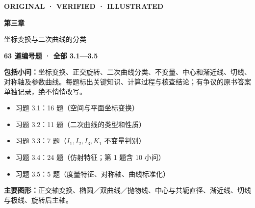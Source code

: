 \documentclass[UTF8,a4paper,11pt,fontset=none]{ctexart}
\begin{document}
\thispagestyle{empty}
\vspace*{19mm}
{\sffamily\large\color{mint}\bfseries ORIGINAL · VERIFIED · ILLUSTRATED}\par
\vspace{8mm}
{\sffamily\fontsize{29}{38}\selectfont\bfseries\color{ink} 第三章}\par
\vspace{1mm}
{\sffamily\fontsize{22}{31}\selectfont\color{accent} 坐标变换与二次曲线的分类}\par
\vspace{13mm}
\begin{tcolorbox}[colback=pale,colframe=edge,boxrule=0.6pt,arc=2mm,left=6mm,right=6mm,top=5mm,bottom=5mm]
\Large\bfseries\color{ink} 63 道编号题 · 全部 3.1—3.5 \par\bigskip
\normalsize\normalfont\color{black}
\textbf{包括小问：}坐标变换、正交旋转、二次曲线分类、不变量、中心和渐近线、切线、对称轴及参数曲线。每题标出关键知识、计算过程与核查结论；有争议的原书答案单独记录，绝不悄悄改写。
\begin{itemize}
\item 习题 3.1：16 题（空间与平面坐标变换）
\item 习题 3.2：11 题（二次曲线的类型和性质）
\item 习题 3.3：7 题（$I_1,I_2,I_3,K_1$ 不变量判别）
\item 习题 3.4：24 题（仿射特征；第 1 题含 10 小问）
\item 习题 3.5：5 题（度量特征、对称轴、曲线标准化）
\end{itemize}
\end{tcolorbox}
\vfill
\noindent\textbf{主要图形：}正交轴变换、椭圆／双曲线／抛物线、中心与共轭直径、渐近线、切线与极线、旋转后主轴。\par\medskip
{}
\clearpage
\tableofcontents
\clearpage
\end{document}
